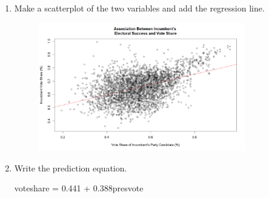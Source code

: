 \documentclass[12pt,letterpaper]{article}
\begin{document}
\begin{enumerate}
		\newpage
		\item Make a scatterplot of the two variables and add the regression line.
		 	
						\begin{figure}[h!]
			\centering
			\caption{\footnotesize}
			\label{fig:plot_3}
			\includegraphics[width=0.85\textwidth]{Plot3}  
		\end{figure} 
			\vspace{2cm}
		\item Write the prediction equation.
		\noindent 
		
		voteshare = 0.441 + 0.388presvote
	\end{enumerate}
	

\newpage	
\end{document}
